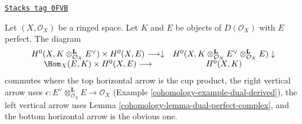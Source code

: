 \begin{lemma}
\label{cohomology-lemma-ext-composition-is-cup}
\href{https://stacks.math.columbia.edu/tag/0FVB}{\texttt{Stacks tag 0FVB}}

Let $(X, \mathcal{O}_X)$ be a ringed space. Let $K$ and $E$ be objects
of $D(\mathcal{O}_X)$ with $E$ perfect. The diagram
$$
\begin{array}{cc}H^0(X, K \otimes_{\mathcal{O}_X}^\mathbf{L} E^\vee) \times H^0(X, E)
\longrightarrow\downarrow & H^0(X, K \otimes_{\mathcal{O}_X}^\mathbf{L} E^\vee
\otimes_{\mathcal{O}_X}^\mathbf{L} E) \downarrow \\ \Hom_X(E, K) \times H^0(X, E) \longrightarrow & H^0(X, K)\end{array}
$$
commutes where the top horizontal arrow is the cup product, the
right vertical arrow uses
$\epsilon : E^\vee \otimes_{\mathcal{O}_X}^\mathbf{L} E \to \mathcal{O}_X$
(Example \ref{cohomology-example-dual-derived}), the left vertical arrow uses
Lemma \ref{cohomology-lemma-dual-perfect-complex}, and the bottom horizontal
arrow is the obvious one.
\end{lemma}

